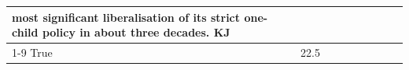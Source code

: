 \begin{table}[H]
\begin{tabular}{lllrlllll}
most significant liberalisation of its strict one-child policy in about three decades. KJ \\
\cline{1-9}
True & 22.5%
\end{tabular}
\end{table}
